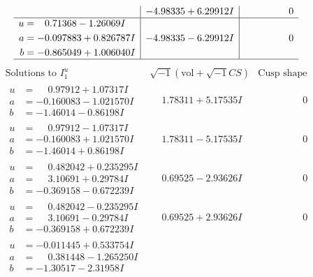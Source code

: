 \documentclass[1p]{elsarticle_modified}
\theoremstyle{definition}
\newcommand{\I}{\sqrt{-1}}
\begin{document}
$$\begin{array}{c|c|c}
 & -4.98335 + 6.29912 I & \phantom{-0.000000 } 0 \\ \hline\begin{aligned}
u &= \phantom{-}0.71368 - 1.26069 I \\
a &= -0.097883 + 0.826787 I \\
b &= -0.865049 + 1.006040 I\end{aligned}
 & -4.98335 - 6.29912 I & \phantom{-0.000000 } 0\\
 \hline 
 \end{array}$$\newpage$$\begin{array}{c|c|c}  
\text{Solutions to }I^u_{1}& \I (\text{vol} + \sqrt{-1}CS) & \text{Cusp shape}\\
 \hline 
\begin{aligned}
u &= \phantom{-}0.97912 + 1.07317 I \\
a &= -0.160083 - 1.021570 I \\
b &= -1.46014 - 0.86198 I\end{aligned}
 & \phantom{-}1.78311 + 5.17535 I & \phantom{-0.000000 } 0 \\ \hline\begin{aligned}
u &= \phantom{-}0.97912 - 1.07317 I \\
a &= -0.160083 + 1.021570 I \\
b &= -1.46014 + 0.86198 I\end{aligned}
 & \phantom{-}1.78311 - 5.17535 I & \phantom{-0.000000 } 0 \\ \hline\begin{aligned}
u &= \phantom{-}0.482042 + 0.235295 I \\
a &= \phantom{-}3.10691 + 0.29784 I \\
b &= -0.369158 - 0.672239 I\end{aligned}
 & \phantom{-}0.69525 - 2.93626 I & \phantom{-0.000000 } 0 \\ \hline\begin{aligned}
u &= \phantom{-}0.482042 - 0.235295 I \\
a &= \phantom{-}3.10691 - 0.29784 I \\
b &= -0.369158 + 0.672239 I\end{aligned}
 & \phantom{-}0.69525 + 2.93626 I & \phantom{-0.000000 } 0 \\ \hline\begin{aligned}
u &= -0.011445 + 0.533754 I \\
a &= \phantom{-}0.381448 - 1.265250 I \\
b &= -1.30517 - 2.31958 I\end{aligned}

\end{array}$$
\end{document}
